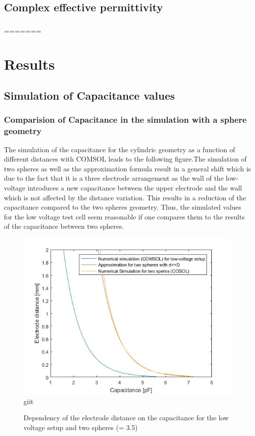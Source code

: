 \section{Complex effective permittivity}
\subsection{}
=======
\chapter{Results}
\section{Simulation of Capacitance values}
\subsection{Comparision of Capacitance in the simulation with a sphere geometry}
The simulation of the capacitance for the cylindric geometry as a function of different distances with COMSOL leads to the following figure.The simulation of two spheres as well as the approximation formula result in a general shift which is due to the fact that it is a three electrode arrangement as the wall of the low-voltage introduces a new capacitance between the upper electrode and the wall which is not affected by the distance variation. This results in a reduction of the capacitance compared to the two spheres geometry. Thus, the simulated values for the low voltage test cell seem reasonable if one compares them to the results of the capacitance between two spheres. \newline 


\begin{figure}[htbp]
	\centering
	\includegraphics[scale=0.3]{figures/Comparison_Low_voltage_Two_spheres}		
giit 	\caption[Kurze Abbildungsbeschreibung]{Dependency of the electrode distance on the capacitance for the low voltage setup and two spheres (\epsilon = 3.5) } %
	\label{fig.waveforms}
\end{figure}

